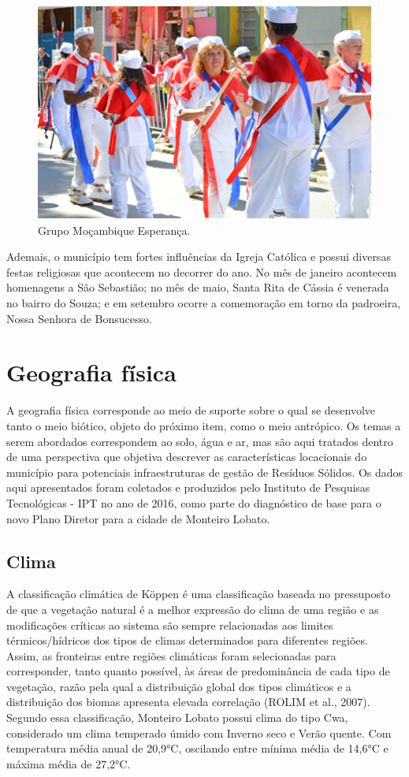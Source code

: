  \begin{figure}[h!]
	\centering
	\includegraphics[width=0.85\linewidth]{produtos/proddois/image25}
	\caption{Grupo Moçambique Esperança.}
	\label{fig:image25}
\end{figure}

Ademais, o município tem fortes influências da Igreja Católica e possui diversas festas religiosas que acontecem no decorrer do ano. No mês de janeiro acontecem homenagens a São Sebastião; no mês de maio, Santa Rita de Cássia é venerada no bairro do Souza; e em setembro ocorre a comemoração em torno da padroeira, Nossa Senhora de Bonsucesso. 

\section{Geografia física}

A geografia física corresponde ao meio de suporte sobre o qual se desenvolve tanto o meio biótico, objeto do próximo item, como o meio antrópico. Os temas a serem abordados correspondem ao solo, água e ar, mas são aqui tratados dentro de uma perspectiva que objetiva descrever as características locacionais do município para potenciais infraestruturas de gestão de Resíduos Sólidos. Os dados aqui apresentados foram coletados e produzidos pelo Instituto de Pesquisas Tecnológicas - IPT no ano de 2016, como parte do diagnóstico de base para o novo Plano Diretor para a cidade de Monteiro Lobato.

\subsection{Clima}

A classificação climática de Köppen é uma classificação baseada no pressuposto de que a vegetação natural é a melhor expressão do clima de uma região e as modificações críticas ao sistema são sempre relacionadas aos limites térmicos/hídricos dos tipos de climas determinados para diferentes regiões. Assim, as fronteiras entre regiões climáticas foram selecionadas para corresponder, tanto quanto possível, às áreas de predominância de cada tipo de vegetação, razão pela qual a distribuição global dos tipos climáticos e a distribuição dos biomas apresenta elevada correlação (ROLIM et al., 2007). Segundo essa classificação, Monteiro Lobato possui clima do tipo Cwa, considerado um clima temperado úmido com Inverno seco e Verão quente. Com temperatura média anual de 20,9°C, oscilando entre mínima média de 14,6°C e máxima média de 27,2°C.

